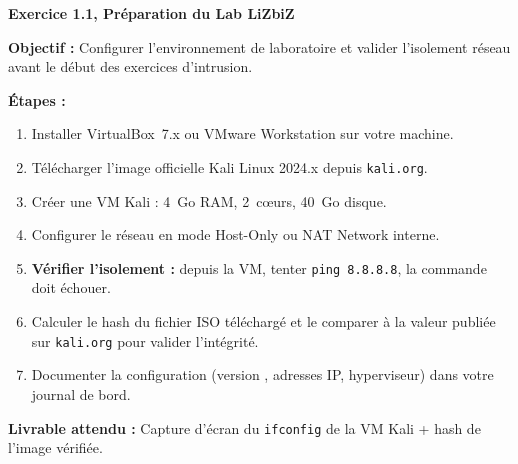 \begin{boxexo}
\textbf{Exercice 1.1, Préparation du Lab LiZbiZ}

\medskip
\textbf{Objectif :} Configurer l'environnement de laboratoire et valider
l'isolement réseau avant le début des exercices d'intrusion.

\medskip
\textbf{Étapes :}
\begin{enumerate}
    \item Installer VirtualBox~7.x ou VMware Workstation sur votre machine.
    \item Télécharger l'image officielle Kali Linux 2024.x depuis
          \texttt{kali.org}.
    \item Créer une VM Kali : 4~Go RAM, 2~c\oe{}urs, 40~Go disque.
    \item Configurer le réseau en mode \og{}Host-Only\fg{} ou
          \og{}NAT Network\fg{} interne.
    \item \textbf{Vérifier l'isolement :} depuis la VM, tenter
          \texttt{ping 8.8.8.8}, la commande doit échouer.
    \item Calculer le hash  du fichier ISO téléchargé et le
          comparer à la valeur publiée sur \texttt{kali.org} pour valider
          l'intégrité.
    \item Documenter la configuration (version , adresses IP,
          hyperviseur) dans votre journal de bord.
\end{enumerate}

\medskip
\textbf{Livrable attendu :} Capture d'écran du \texttt{ifconfig} de la VM Kali
+ hash  de l'image vérifiée.
\end{boxexo}
